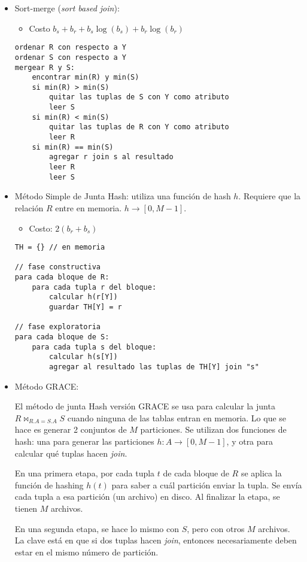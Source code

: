 \documentclass[a4paper, twoside]{article}
\begin{document}
\begin{itemize}
	\item Sort-merge (\emph{sort based join}): 
	\begin{itemize}
		\item Costo $b_{s}+b_{r}+b_{s}\log(b_{s})+b_{r}\log(b_{r})$
	\end{itemize}

	\begin{lstlisting}
ordenar R con respecto a Y
ordenar S con respecto a Y
mergear R y S:
	encontrar min(R) y min(S)
	si min(R) > min(S)
		quitar las tuplas de S con Y como atributo
		leer S
	si min(R) < min(S)
		quitar las tuplas de R con Y como atributo
		leer R
	si min(R) == min(S)
		agregar r join s al resultado
		leer R
		leer S
	\end{lstlisting}

	\item Método Simple de Junta Hash: utiliza una función de hash $h$. Requiere que la relación $R$ entre en memoria. $h\to[0,M-1]$.
	\begin{itemize}
		\item Costo: $2\left(b_{r}+b_{s}\right)$
	\end{itemize}

	\begin{lstlisting}
TH = {} // en memoria

// fase constructiva
para cada bloque de R:
	para cada tupla r del bloque:
		calcular h(r[Y])
		guardar TH[Y] = r

// fase exploratoria
para cada bloque de S:
	para cada tupla s del bloque:
		calcular h(s[Y])
		agregar al resultado las tuplas de TH[Y] join "s"
	\end{lstlisting}

	\item Método GRACE:

	El método de junta Hash versión GRACE se usa para calcular la junta $R \bowtie_{R.A=S.A}S$ cuando ninguna de las tablas entran en memoria. Lo que se hace es generar 2 conjuntos de $M$ particiones. Se utilizan dos funciones de hash: una para generar las particiones $h:A\to[0,M-1]$, y otra para calcular qué tuplas hacen \emph{join}.

	En una primera etapa, por cada tupla $t$ de cada bloque de $R$ se aplica la función de hashing $h(t)$ para saber a cuál partición enviar la tupla. Se envía cada tupla a esa partición (un archivo) en disco. Al finalizar la etapa, se tienen $M$ archivos.

	En una segunda etapa, se hace lo mismo con $S$, pero con otros $M$ archivos. La clave está en que si dos tuplas hacen \emph{join}, entonces necesariamente deben estar en el mismo número de partición. 


\end{itemize}
\end{document}
